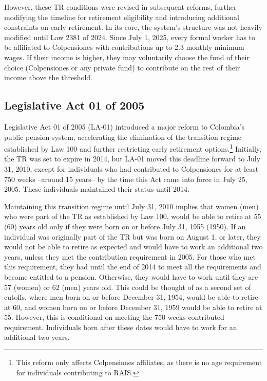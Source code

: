 \documentclass[12pt, a4paper]{article}
\begin{document}
However, these TR conditions were revised in subsequent reforms, further modifying the timeline for retirement eligibility and introducing additional constraints on early retirement. In its core, the system's structure was not heavily modified until Law 2381 of 2024. Since July 1, 2025, every formal worker has to be affiliated to Colpensiones with contributions up to 2.3 monthly minimum wages. If their income is higher, they may voluntarily choose the fund of their choice (Colpensiones or any private fund) to contribute on the rest of their income above the threshold.

\subsection{Legislative Act 01 of 2005 \label{subsec:la01}}

Legislative Act 01 of 2005 (LA-01) introduced a major reform to Colombia’s public pension system, accelerating the elimination of the transition regime established by Law 100 and further restricting early retirement options.\footnote{This reform only affects Colpensiones affiliates, as there is no age requirement for individuals contributing to RAIS.} Initially, the TR was set to expire in 2014, but LA-01 moved this deadline forward to July 31, 2010, except for individuals who had contributed to Colpensiones for at least 750 weeks --around 15 years-- by the time this Act came into force in July 25, 2005. These individuals maintained their status until 2014.

Maintaining this transition regime until July 31, 2010 implies that women (men) who were part of the TR as established by Law 100, would be able to retire at 55 (60) years old only if they were born on or before July 31, 1955 (1950). If an individual was originally part of the TR but was born on August 1, or later, they would not be able to retire as expected and would have to work an additional two years, unless they met the contribution requirement in 2005. For those who met this requirement, they had until the end of 2014 to meet all the requirements and become entitled to a pension. Otherwise, they would have to work until they are 57 (women) or 62 (men) years old. This could be thought of as a second set of cutoffs, where men born on or before December 31, 1954, would be able to retire at 60, and women born on or before December 31, 1959 would be able to retire at 55. However, this is conditional on meeting the 750 weeks contributed requirement. Individuals born after these dates would have to work for an additional two years.
\end{document}
